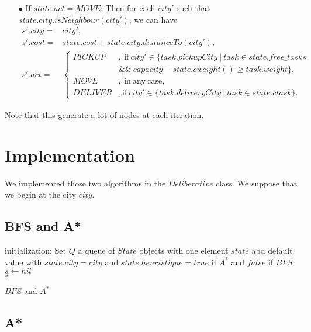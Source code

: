 \documentclass[11pt]{article}
\begin{document}
\begin{itemize}
			
	\item[$\bullet$] \underline{If $state.act=MOVE$}:  Then for each $city'$ such that $state.city.isNeighbour(city')$, we can have 
		\begin{align*}
			s'.city =& city',\\
			s'.cost =& state.cost+state.city.distanceTo(city'),\\
			s'.act =& \begin{cases}
						PICKUP &,\ \mathrm{if}\ city'\in\{task.pickupCity\ |\ task\in state.free\_tasks\\
								& \&\&\ capacity -state.cweight()\geq task.weight\},\\
						MOVE &,\ \mathrm{in\ any\  case},\\
						DELIVER  &, \mathrm{if}\ city'\in\{task.deliveryCity\ |\ task\in state.ctask\}.
					\end{cases}
		\end{align*}
\end{itemize}

Note that this generate a lot of nodes at each iteration. 
			

\section{Implementation}
We implemented those two algorithms in the $Deliberative$ class. We suppose that we begin at the city $city$.
\subsection{BFS and A*}
\begin{algorithm}[H]
	\SetAlgoLined
	initialization: Set $Q$ a queue of $State$ objects with one element $state$ abd default value with $state.city = city$ and $state.heuristique = true$ if $A^*$ and $false$ if $BFS$\\
	$s\leftarrow nil$\\
	\Return $s$\caption{$BFS$ and $A^*$}
\end{algorithm}
				

\subsection{A*}
\end{document}
